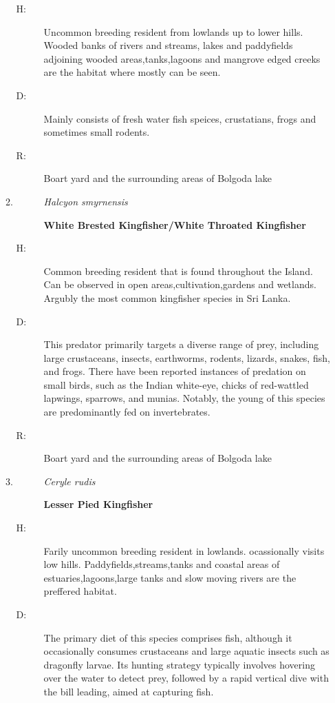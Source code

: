 \begin{itemize}
\begin{enumerate}
\begin{description}
\item[H: ]%
Uncommon breeding resident from lowlands up to lower hills. Wooded banks of rivers and streams, lakes and paddyfields adjoining wooded areas,tanks,lagoons and mangrove edged creeks are the habitat where mostly can be seen. %
\item[D: ]%
Mainly consists of fresh water fish speices, crustatians, frogs and sometimes small rodents.%
\item[R: ]%
Boart yard and the surrounding areas of Bolgoda lake%
\end{description}%
\item%
\begin{description}%
\item[]%
\textit{Halcyon smyrnensis}%
\item[]%
\textbf{White Brested Kingfisher/White Throated Kingfisher}%
\end{description}%
\begin{description}%
\item[H: ]%
Common breeding resident that is found throughout the Island. Can be observed in open areas,cultivation,gardens and wetlands. Argubly the most common kingfisher species in Sri Lanka.%
\item[D: ]%
This predator primarily targets a diverse range of prey, including large crustaceans, insects, earthworms, rodents, lizards, snakes, fish, and frogs. There have been reported instances of predation on small birds, such as the Indian white{-}eye, chicks of red{-}wattled lapwings, sparrows, and munias. Notably, the young of this species are predominantly fed on invertebrates.%
\item[R: ]%
Boart yard and the surrounding areas of Bolgoda lake%
\end{description}%
\item%
\begin{description}%
\item[]%
\textit{Ceryle rudis}%
\item[]%
\textbf{Lesser Pied Kingfisher}%
\end{description}%
\begin{description}%
\item[H: ]%
Farily uncommon breeding resident in lowlands. ocassionally visits low hills. Paddyfields,streams,tanks and coastal areas of estuaries,lagoons,large tanks and slow moving rivers are the preffered habitat.%
\item[D: ]%
The primary diet of this species comprises fish, although it occasionally consumes crustaceans and large aquatic insects such as dragonfly larvae. Its hunting strategy typically involves hovering over the water to detect prey, followed by a rapid vertical dive with the bill leading, aimed at capturing fish.%

\end{description}
\end{enumerate}
\end{itemize}
